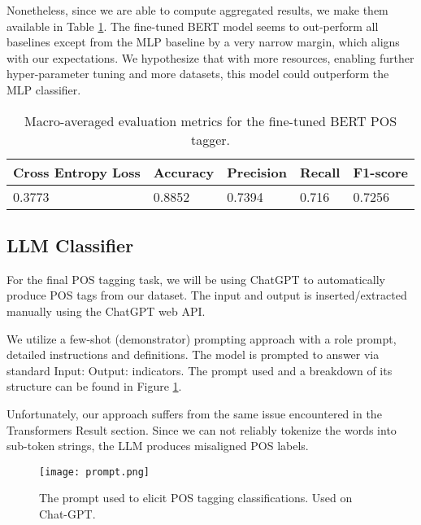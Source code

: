 \documentclass[10pt, a4paper]{article}
\begin{document}
	Nonetheless, since we are able to compute aggregated results, we make them available in Table \ref{tab::bert_results}. The fine-tuned BERT model seems to out-perform all baselines except from the MLP baseline by a very narrow margin, which aligns with our expectations. We hypothesize that with more resources, enabling further hyper-parameter tuning and more datasets, this model could outperform the MLP classifier.
	
	
	\begin{table}
		\begin{tabular}{|l|l|l|l|l|}
			\hline
			\cellcolor{blue!25}\textbf{Cross Entropy Loss} & 
			\cellcolor{blue!25}\textbf{Accuracy} &
			\cellcolor{blue!25}\textbf{Precision} &
			\cellcolor{blue!25}\textbf{Recall}  &
			\cellcolor{blue!25}\textbf{F1-score} \\
			\hline
			0.3773 & 0.8852 & 0.7394 & 0.716 & 0.7256 \\
			\hline			
		\end{tabular}
		\centering
		\caption{Macro-averaged evaluation metrics for the fine-tuned BERT POS tagger.}
		\label{tab::bert_results}
	\end{table}
	
	
	\subsection{LLM Classifier}
	
	For the final POS tagging task, we will be using ChatGPT to automatically produce POS tags from our dataset. The input and output is inserted/extracted manually using the ChatGPT web API.
	
	We utilize a few-shot (demonstrator) prompting approach with a role prompt, detailed instructions and definitions. The model is prompted to answer via standard Input: Output: indicators. The prompt used and a breakdown of its structure can be found in Figure \ref{fig::prompt.png}.
	
	Unfortunately, our approach suffers from the same issue encountered in the Transformers Result section. Since we can not reliably tokenize the words into sub-token strings, the LLM produces misaligned POS labels.
	
	\begin{figure}
		\centering
		\texttt{[image: prompt.png]}
		\caption{The prompt used to elicit POS tagging classifications. Used on Chat-GPT.}
		\label{fig::prompt.png}
	\end{figure}
	
\end{document}
